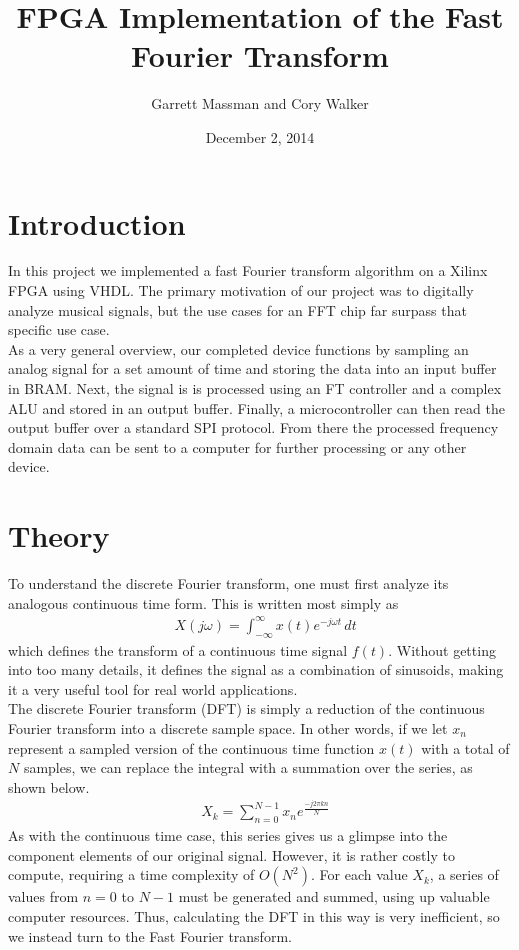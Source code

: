 \documentclass[12pt]{article}
\title{\textbf{FPGA Implementation of the Fast Fourier Transform}}
\date{December 2, 2014}
\author{Garrett Massman and Cory Walker}
\begin{document}
  \maketitle
  \clearpage

  \section*{Introduction}
    In this project we implemented a fast Fourier transform algorithm on a Xilinx FPGA using VHDL. The primary motivation of our project was to digitally analyze musical signals, but the use cases for an FFT chip far surpass that specific use case. \\
    
    As a very general overview, our completed device functions by sampling an analog signal for a set amount of time and storing the data into an input buffer in BRAM. Next, the signal is is processed using an FT controller and a complex ALU and stored in an output buffer. Finally, a microcontroller can then read the output buffer over a standard SPI protocol. From there the processed frequency domain data can be sent to a computer for further processing or any other device.

  \section*{Theory}
    To understand the discrete Fourier transform, one must first analyze its analogous continuous    time form.
    This is written most simply as
    \begin{align*}
    &X(j\omega) = \int_{-\infty}^{\infty} x(t) e^{-j \omega t}\,dt
    \end{align*}
    which defines the transform of a continuous time signal $f(t)$.
    Without getting into too many details, it defines the signal as a combination of sinusoids,      making it a very useful tool for real world applications.\\

    The discrete Fourier transform (DFT) is simply a reduction of the continuous Fourier transform   into a discrete sample space.
    In other words, if we let $x_n$ represent a sampled version of the continuous time function      $x(t)$ with a total of $N$ samples, we can replace the integral with a summation over the series, as shown below.
    \begin{align*}
        &X_k = \sum\limits_{n=0}^{N-1} x_n e^{\frac{-j2\pi kn}{N}}
    \end{align*}
    As with the continuous time case, this series gives us a glimpse into the component elements of  our original signal.
    However, it is rather costly to compute, requiring a time complexity of $O(N^2)$.
    For each value $X_k$, a series of values from $n = 0$ to $N - 1$ must be generated and summed,   using up valuable computer resources.
    Thus, calculating the DFT in this way is very inefficient, so we instead turn to the Fast  Fourier transform.\\
\end{document}
